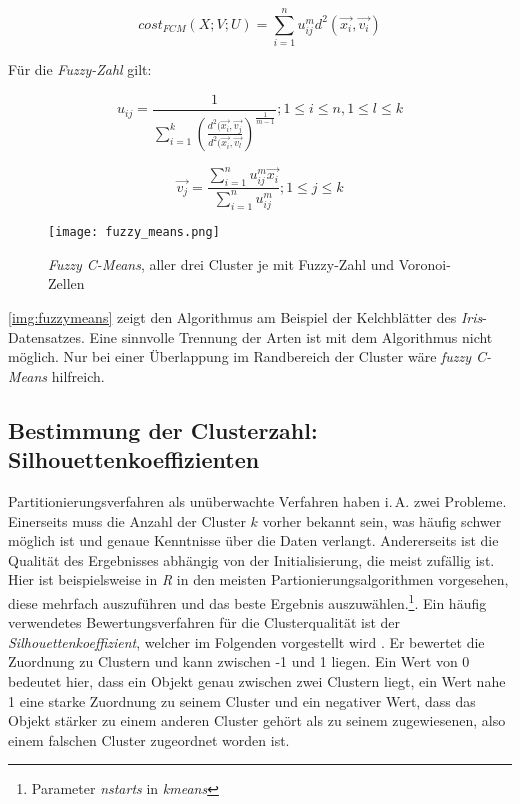 \documentclass[a4paper,12pt,twoside]{article}
\newcommand{\Fachbegriff}[1]{\textit{#1}}
\begin{document}
\begin{equation}
cost_{FCM} (X;V;U) = \sum_{i=1}^n u_{ij}^m d^2 (\vec{x_i},\vec{v_i}) 
\end{equation}

Für die \Fachbegriff{Fuzzy-Zahl} gilt:

\begin{equation}
u_{ij} = \frac{1}{\sum_{i=1}^{k} (\frac{d^2 (\vec{x_i},\vec{v_j}}{d^2 (\vec{x_i},\vec{v_l}})^{\frac{1}{m-1}}}; 1 \leq i \leq n, 1 \leq l \leq k 
\end{equation}

\begin{equation}
\vec{v_j} = \frac{\sum_{i=1}^n u_{ij}^m \vec{x_i}}{\sum_{i=1}^n u_{ij}^m}; 1 \leq j \leq k 
\end{equation}

\begin{figure}
	\centering
	\texttt{[image: fuzzy\_means.png]}
	\caption{\Fachbegriff{Fuzzy C-Means}, aller drei Cluster je mit Fuzzy-Zahl und Voronoi-Zellen}
	\label{img:fuzzymeans}
\end{figure}

\autoref{img:fuzzymeans} zeigt den Algorithmus am Beispiel der Kelchblätter des \Fachbegriff{Iris}-Datensatzes. Eine sinnvolle Trennung der Arten ist mit dem Algorithmus nicht möglich. Nur bei einer Überlappung im Randbereich der Cluster wäre \Fachbegriff{fuzzy C-Means} hilfreich.

\subsection{Bestimmung der Clusterzahl: Silhouettenkoeffizienten}

Partitionierungsverfahren als unüberwachte Verfahren haben i.\,A. zwei Probleme. Einerseits muss die Anzahl der Cluster $k$ vorher bekannt sein, was häufig schwer möglich ist und genaue Kenntnisse über die Daten verlangt. Andererseits ist die Qualität des Ergebnisses abhängig von der Initialisierung, die meist zufällig ist. Hier ist beispielsweise in \Fachbegriff{R} in den meisten Partionierungsalgorithmen vorgesehen, diese mehrfach auszuführen und das beste Ergebnis auszuwählen.\footnote{Parameter \Fachbegriff{nstarts} in \Fachbegriff{kmeans}}. Ein häufig verwendetes Bewertungsverfahren für die Clusterqualität ist der \Fachbegriff{Silhouettenkoeffizient}, welcher im Folgenden vorgestellt wird \autocite[][83 ff]{Kaufman.2009}. Er bewertet die Zuordnung zu Clustern und kann zwischen -1 und 1 liegen. Ein Wert von 0 bedeutet hier, dass ein Objekt genau zwischen zwei Clustern liegt, ein Wert nahe 1 eine starke Zuordnung zu seinem Cluster und ein negativer Wert, dass das Objekt stärker zu einem anderen Cluster gehört als zu seinem zugewiesenen, also einem falschen Cluster zugeordnet worden ist.
\end{document}
